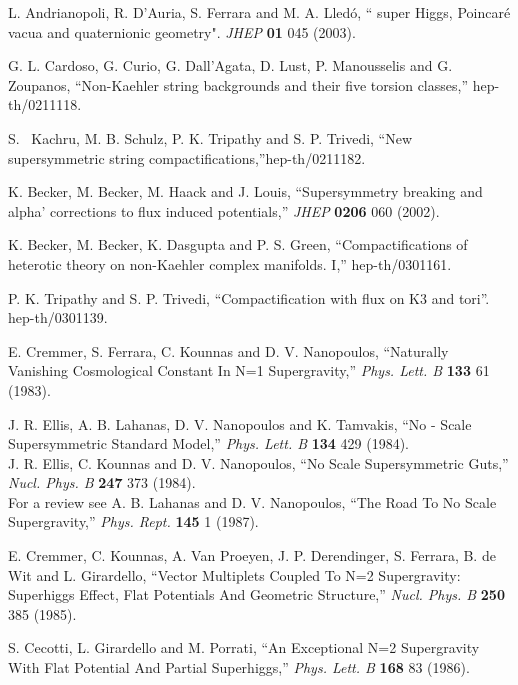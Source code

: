 \documentclass[a4paper,12pt]{article}
\begin{document}
\begin{thebibliography}{99}
 L. Andrianopoli, R. D'Auria, S. Ferrara and M. A. Lled\'o,
``\coordHE{} super Higgs, \coordHE{} Poincar\'e vacua and quaternionic
geometry". {\it JHEP} {\bf 01} 045 (2003).

G. L. Cardoso, G. Curio, G. Dall'Agata, D. Lust, P. Manousselis
and G. Zoupanos, ``Non-Kaehler string backgrounds and their five
torsion classes,'' hep-th/0211118.

S.~ Kachru, M. B. Schulz, P. K. Tripathy and S. P. Trivedi, ``New
supersymmetric string compactifications,''hep-th/0211182.


K. Becker, M. Becker, M. Haack and J. Louis, ``Supersymmetry
breaking and alpha' corrections to flux induced  potentials,''
{\it JHEP} {\bf 0206} 060 (2002).



K. Becker, M. Becker, K. Dasgupta and P. S. Green,
``Compactifications of heterotic theory on non-Kaehler complex
manifolds.  I,'' hep-th/0301161.

 P. K. Tripathy and S. P. Trivedi,
``Compactification with flux on K3 and tori''. hep-th/0301139.




 E. Cremmer, S. Ferrara, C. Kounnas and D. V. Nanopoulos,
``Naturally Vanishing Cosmological Constant In N=1 Supergravity,''
{\it Phys.  Lett.  B} {\bf 133} 61 (1983).



 J. R. Ellis, A. B. Lahanas, D. V. Nanopoulos and K. Tamvakis,
``No - Scale Supersymmetric Standard Model,'' {\it Phys.  Lett. B}
{\bf 134} 429 (1984). \\
J. R. Ellis, C. Kounnas and D. V. Nanopoulos, ``No Scale
Supersymmetric Guts,'' {\it Nucl. Phys.  B} {\bf 247} 373 (1984).\\
For a review  see A. B. Lahanas and D. V. Nanopoulos, ``The Road
To No Scale Supergravity,''
 {\it Phys.  Rept. } {\bf 145} 1 (1987).



 E. Cremmer, C. Kounnas, A. Van Proeyen, J. P.
 Derendinger, S. Ferrara, B. de Wit and L. Girardello,
``Vector Multiplets Coupled To N=2 Supergravity: Superhiggs
Effect, Flat Potentials And Geometric Structure,'' {\it Nucl.
Phys.  B} {\bf 250} 385 (1985).


 S.  Cecotti, L. Girardello and M. Porrati,
``An Exceptional N=2 Supergravity With Flat Potential And Partial
Superhiggs,''
 {\it Phys. Lett. B} {\bf 168} 83 (1986).




\end{thebibliography}
\end{document}
